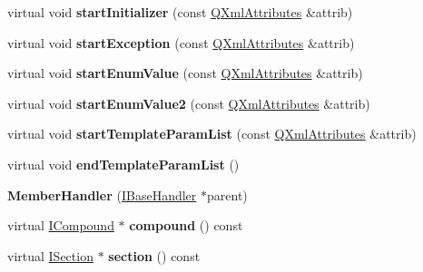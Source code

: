 \begin{DoxyCompactItemize}
\item 
\hypertarget{class_member_handler_ac94228dc28efdaf60c482d81cec34230}{virtual void {\bfseries start\-Initializer} (const \hyperlink{class_q_xml_attributes}{Q\-Xml\-Attributes} \&attrib)}\label{class_member_handler_ac94228dc28efdaf60c482d81cec34230}

\item 
\hypertarget{class_member_handler_a8303d91d3a89ab42bce7698a71e74888}{virtual void {\bfseries start\-Exception} (const \hyperlink{class_q_xml_attributes}{Q\-Xml\-Attributes} \&attrib)}\label{class_member_handler_a8303d91d3a89ab42bce7698a71e74888}

\item 
\hypertarget{class_member_handler_a66d8cf46d4c2a79dc2bfd75e3f2e8f14}{virtual void {\bfseries start\-Enum\-Value} (const \hyperlink{class_q_xml_attributes}{Q\-Xml\-Attributes} \&attrib)}\label{class_member_handler_a66d8cf46d4c2a79dc2bfd75e3f2e8f14}

\item 
\hypertarget{class_member_handler_a23d6f8d505fda4cb4503be5b3b918885}{virtual void {\bfseries start\-Enum\-Value2} (const \hyperlink{class_q_xml_attributes}{Q\-Xml\-Attributes} \&attrib)}\label{class_member_handler_a23d6f8d505fda4cb4503be5b3b918885}

\item 
\hypertarget{class_member_handler_a2de4ded6787264c3be9d44c1b532114b}{virtual void {\bfseries start\-Template\-Param\-List} (const \hyperlink{class_q_xml_attributes}{Q\-Xml\-Attributes} \&attrib)}\label{class_member_handler_a2de4ded6787264c3be9d44c1b532114b}

\item 
\hypertarget{class_member_handler_aed63efd221f19c6393c9793cdc757dac}{virtual void {\bfseries end\-Template\-Param\-List} ()}\label{class_member_handler_aed63efd221f19c6393c9793cdc757dac}

\item 
\hypertarget{class_member_handler_a20ca817cf509b43896f8177c5547ff47}{{\bfseries Member\-Handler} (\hyperlink{class_i_base_handler}{I\-Base\-Handler} $\ast$parent)}\label{class_member_handler_a20ca817cf509b43896f8177c5547ff47}

\item 
\hypertarget{class_member_handler_aa2377116cf3d80b3fed3cd9963fd509d}{virtual \hyperlink{class_i_compound}{I\-Compound} $\ast$ {\bfseries compound} () const }\label{class_member_handler_aa2377116cf3d80b3fed3cd9963fd509d}

\item 
\hypertarget{class_member_handler_ab055d77ae7c7d74e1327edb7938d344d}{virtual \hyperlink{class_i_section}{I\-Section} $\ast$ {\bfseries section} () const }\label{class_member_handler_ab055d77ae7c7d74e1327edb7938d344d}


\end{DoxyCompactItemize}
